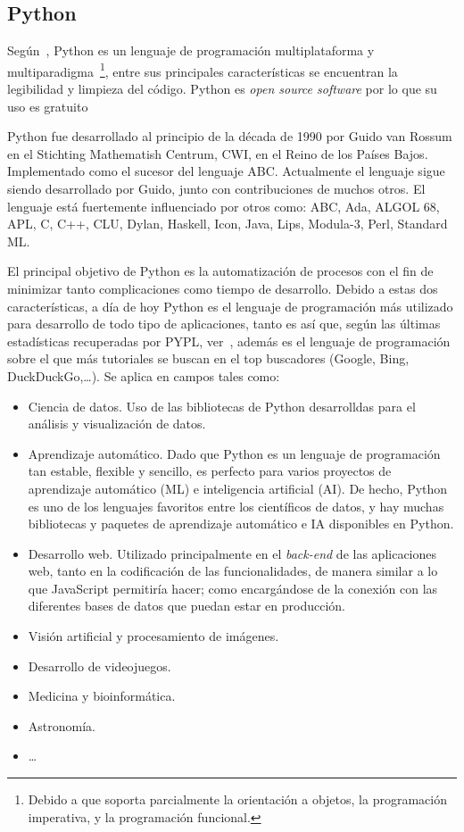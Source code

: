 \subsection{Python}
Según~\cite{queespython}, Python es un lenguaje de programación multiplataforma y multiparadigma~\footnote{Debido a que soporta parcialmente la orientación a objetos, la programación imperativa, y la programación funcional.}, entre sus principales características se encuentran la legibilidad y limpieza del código. Python es \textit{open source software} por lo que su uso es gratuito~\cite{pythonLICENSE}

Python fue desarrollado al principio de la década de 1990 por Guido van Rossum en el Stichting Mathematish Centrum, CWI, en el Reino de los Países Bajos. Implementado como el sucesor del lenguaje ABC. Actualmente el lenguaje sigue siendo desarrollado por Guido, junto con contribuciones de muchos otros. El lenguaje está fuertemente influenciado por otros como: ABC, Ada, ALGOL 68, APL, C, C++, CLU, Dylan, Haskell, Icon, Java, Lips, Modula-3, Perl, Standard ML.

El principal objetivo de Python es la automatización de procesos con el fin de minimizar tanto complicaciones como tiempo de desarrollo. Debido a estas dos características, a día de hoy Python es el lenguaje de programación más utilizado para desarrollo de todo tipo de aplicaciones, tanto es así que, según las últimas estadísticas recuperadas por PYPL, ver~\cite{pyplindex}, además es el lenguaje de programación sobre el que más tutoriales se buscan en el top buscadores (Google, Bing, DuckDuckGo,\dots). Se aplica en campos tales como:
\begin{itemize}
\item Ciencia de datos. Uso de las bibliotecas de Python desarrolldas para el análisis y visualización de datos.
\item Aprendizaje automático. Dado que Python es un lenguaje de programación tan estable, flexible y sencillo, es perfecto para varios proyectos de aprendizaje automático (ML) e inteligencia artificial (AI). De hecho, Python es uno de los lenguajes favoritos entre los científicos de datos, y hay muchas bibliotecas y paquetes de aprendizaje automático e IA disponibles en Python. 
\item Desarrollo web. Utilizado principalmente en el \textit{back-end} de las aplicaciones web, tanto en la codificación de las funcionalidades, de manera similar a lo que JavaScript permitiría hacer; como encargándose de la conexión con las diferentes bases de datos que puedan estar en producción.
\item Visión artificial y procesamiento de imágenes. 
\item Desarrollo de videojuegos.
\item Medicina y bioinformática.
\item Astronomía.
\item \dots
\end{itemize}

